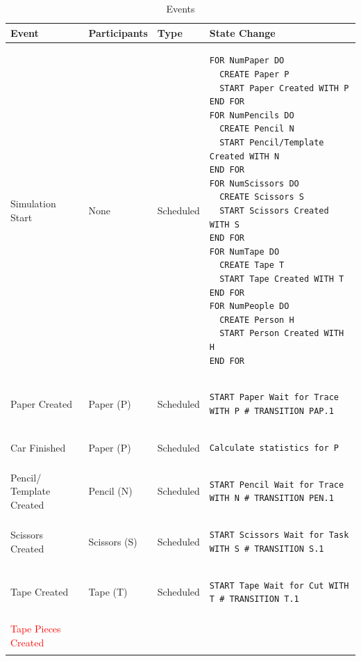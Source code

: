 \documentclass[
  10pt,
  a4paperpaper,
  DIV=11,
  numbers=noendperiod,
  oneside]{scrreprt}
\begin{document}
\begin{longtable}{@{}>{\raggedright\arraybackslash}p{1.5cm}>{\raggedright\arraybackslash}p{2.1cm}>{\raggedright\arraybackslash}p{2.2cm}>{\raggedright\arraybackslash}p{10cm}@{}}

\caption{\label{tbl-events_pc}Events}

\tabularnewline

  \toprule
  Event          & Participants & Type       & State Change \\ \midrule
  \endhead
  Simulation Start & None  & Scheduled  & 
  \begin{lstlisting}[language=CMPseudo]
FOR NumPaper DO
  CREATE Paper P
  START Paper Created WITH P
END FOR
FOR NumPencils DO
  CREATE Pencil N
  START Pencil/Template Created WITH N
END FOR
FOR NumScissors DO
  CREATE Scissors S
  START Scissors Created WITH S
END FOR
FOR NumTape DO
  CREATE Tape T
  START Tape Created WITH T
END FOR
FOR NumPeople DO
  CREATE Person H
  START Person Created WITH H
END FOR
  \end{lstlisting}
  \\ \midrule
  Paper Created & Paper (P)  & Scheduled  & 
  \begin{lstlisting}[language=CMPseudo]
START Paper Wait for Trace WITH P # TRANSITION PAP.1
  \end{lstlisting}
  \\ \midrule
  Car Finished & Paper (P)  & Scheduled  & 
  \begin{lstlisting}[language=CMPseudo]
Calculate statistics for P
  \end{lstlisting}
  \\ \midrule
  Pencil/ Template Created & Pencil (N)  & Scheduled  & 
  \begin{lstlisting}[language=CMPseudo]
START Pencil Wait for Trace WITH N # TRANSITION PEN.1
  \end{lstlisting}
  \\ \midrule
  Scissors Created & Scissors (S)  & Scheduled  & 
  \begin{lstlisting}[language=CMPseudo]
START Scissors Wait for Task WITH S # TRANSITION S.1
  \end{lstlisting}
  \\ \midrule
  Tape Created & Tape (T)  & Scheduled  & 
  \begin{lstlisting}[language=CMPseudo]
START Tape Wait for Cut WITH T # TRANSITION T.1
  \end{lstlisting}
  \\ \midrule
  \textcolor{Red}{Tape Pieces Created} &   &  & 
  \begin{lstlisting}[language=CMPseudo]
  

\end{lstlisting}
\end{longtable}
\end{document}
